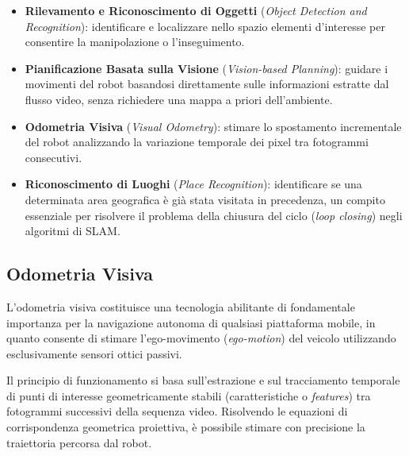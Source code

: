 ﻿\documentclass[11pt, a4paper]{article}
\begin{document}
\begin{itemize}[noitemsep]
    \item \textbf{Rilevamento e Riconoscimento di Oggetti} (\emph{Object Detection and Recognition}): identificare e localizzare nello spazio elementi d'interesse per consentire la manipolazione o l'inseguimento.
    \item \textbf{Pianificazione Basata sulla Visione} (\emph{Vision-based Planning}): guidare i movimenti del robot basandosi direttamente sulle informazioni estratte dal flusso video, senza richiedere una mappa a priori dell'ambiente.
    \item \textbf{Odometria Visiva} (\emph{Visual Odometry}): stimare lo spostamento incrementale del robot analizzando la variazione temporale dei pixel tra fotogrammi consecutivi.
    \item \textbf{Riconoscimento di Luoghi} (\emph{Place Recognition}): identificare se una determinata area geografica è già stata visitata in precedenza, un compito essenziale per risolvere il problema della chiusura del ciclo (\emph{loop closing}) negli algoritmi di SLAM.
\end{itemize}


\newpage

\subsection{Odometria Visiva}

L'odometria visiva costituisce una tecnologia abilitante di fondamentale importanza per la navigazione autonoma di qualsiasi piattaforma mobile, in quanto consente di stimare l'ego-movimento (\emph{ego-motion}) del veicolo utilizzando esclusivamente sensori ottici passivi.


Il principio di funzionamento si basa sull'estrazione e sul tracciamento temporale di punti di interesse geometricamente stabili (caratteristiche o \emph{features}) tra fotogrammi successivi della sequenza video. Risolvendo le equazioni di corrispondenza geometrica proiettiva, è possibile stimare con precisione la traiettoria percorsa dal robot.
\end{document}
